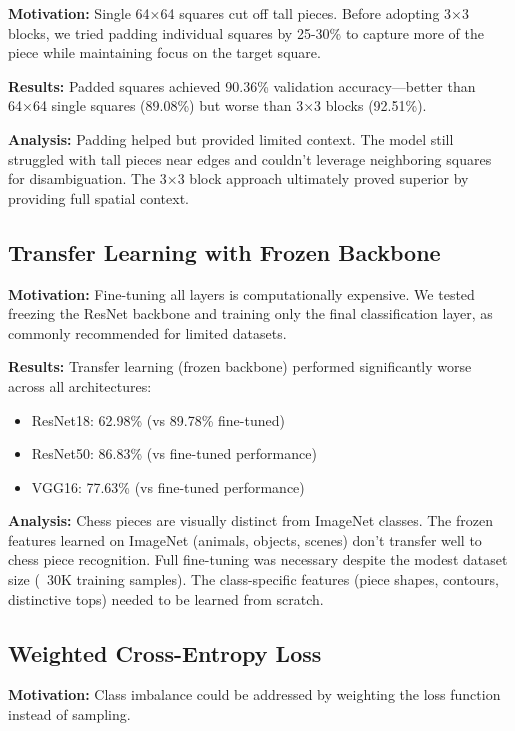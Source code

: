 \documentclass[conference]{IEEEtran}
\begin{document}
\textbf{Motivation:} Single 64×64 squares cut off tall pieces. Before adopting 3×3 blocks, we tried padding individual squares by 25-30\% to capture more of the piece while maintaining focus on the target square.

\textbf{Results:} Padded squares achieved 90.36\% validation accuracy—better than 64×64 single squares (89.08\%) but worse than 3×3 blocks (92.51\%).

\textbf{Analysis:} Padding helped but provided limited context. The model still struggled with tall pieces near edges and couldn't leverage neighboring squares for disambiguation. The 3×3 block approach ultimately proved superior by providing full spatial context.

\subsection{Transfer Learning with Frozen Backbone}

\textbf{Motivation:} Fine-tuning all layers is computationally expensive. We tested freezing the ResNet backbone and training only the final classification layer, as commonly recommended for limited datasets.

\textbf{Results:} Transfer learning (frozen backbone) performed significantly worse across all architectures:
\begin{itemize}
    \item ResNet18: 62.98\% (vs 89.78\% fine-tuned)
    \item ResNet50: 86.83\% (vs fine-tuned performance)
    \item VGG16: 77.63\% (vs fine-tuned performance)
\end{itemize}

\textbf{Analysis:} Chess pieces are visually distinct from ImageNet classes. The frozen features learned on ImageNet (animals, objects, scenes) don't transfer well to chess piece recognition. Full fine-tuning was necessary despite the modest dataset size (~30K training samples). The class-specific features (piece shapes, contours, distinctive tops) needed to be learned from scratch.

\subsection{Weighted Cross-Entropy Loss}

\textbf{Motivation:} Class imbalance could be addressed by weighting the loss function instead of sampling.
\end{document}
